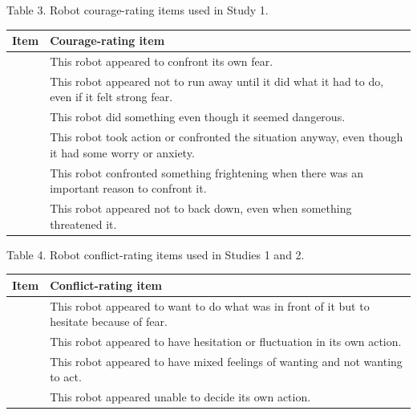 Table 3. Robot courage-rating items used in Study 1.

{\def\LTcaptype{none} %
\begin{longtable}[]{@{}
  >{\raggedright\arraybackslash}p{}
  >{\raggedright\arraybackslash}p{}@{}}
\toprule\noalign{}
\begin{minipage}[b]{\linewidth}\raggedright
Item
\end{minipage} & \begin{minipage}[b]{\linewidth}\raggedright
Courage-rating item
\end{minipage} \\
\midrule\noalign{}
\endhead
\bottomrule\noalign{}
\endlastfoot
1 & This robot appeared to confront its own fear. \\
2 & This robot appeared not to run away until it did what it had to do,
even if it felt strong fear. \\
3 & This robot did something even though it seemed dangerous. \\
4 & This robot took action or confronted the situation anyway, even
though it had some worry or anxiety. \\
5 & This robot confronted something frightening when there was an
important reason to confront it. \\
6 & This robot appeared not to back down, even when something threatened
it. \\
\end{longtable}
}

Table 4. Robot conflict-rating items used in Studies 1 and 2.

{\def\LTcaptype{none} %
\begin{longtable}[]{@{}
  >{\raggedright\arraybackslash}p{}
  >{\raggedright\arraybackslash}p{}@{}}
\toprule\noalign{}
\begin{minipage}[b]{\linewidth}\raggedright
Item
\end{minipage} & \begin{minipage}[b]{\linewidth}\raggedright
Conflict-rating item
\end{minipage} \\
\midrule\noalign{}
\endhead
\bottomrule\noalign{}
\endlastfoot
1 & This robot appeared to want to do what was in front of it but to
hesitate because of fear. \\
2 & This robot appeared to have hesitation or fluctuation in its own
action. \\
3 & This robot appeared to have mixed feelings of wanting and not
wanting to act. \\
4 & This robot appeared unable to decide its own action. \\
\end{longtable}
}

